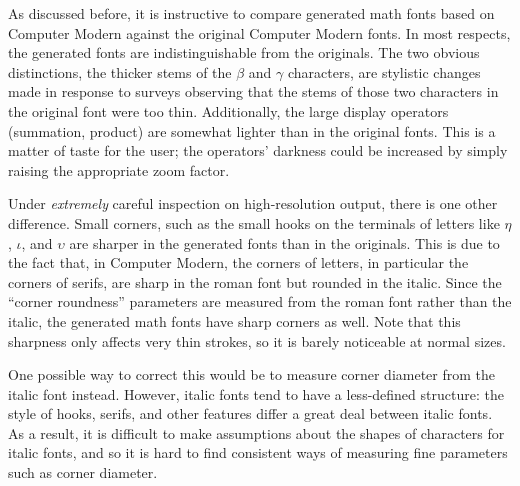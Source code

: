 
As discussed before, it is instructive to compare generated math fonts based on
Computer Modern against the original Computer Modern fonts. In most respects,
the generated fonts are indistinguishable from the originals. The two obvious
distinctions, the thicker stems of the $\beta$ and $\gamma$ characters, are
stylistic changes made in response to surveys observing that the stems of those
two characters in the original font were too thin. Additionally, the large
display operators (summation, product) are somewhat lighter than in the original
fonts. This is a matter of taste for the user; the operators' darkness could be
increased by simply raising the appropriate zoom factor.

Under \emph{extremely} careful inspection on high-resolution output, there is
one other difference. Small corners, such as the small hooks on the terminals of
letters like $\eta$, $\iota$, and $\upsilon$ are sharper in the generated fonts
than in the originals. This is due to the fact that, in Computer Modern, the
corners of letters, in particular the corners of serifs, are sharp in the roman
font but rounded in the italic. Since the ``corner roundness'' parameters are
measured from the roman font rather than the italic, the generated math fonts
have sharp corners as well. Note that this sharpness only affects very thin
strokes, so it is barely noticeable at normal sizes.

One possible way to correct this would be to measure corner diameter from the
italic font instead. However, italic fonts tend to have a less-defined
structure: the style of hooks, serifs, and other features differ a great deal
between italic fonts. As a result, it is difficult to make assumptions about the
shapes of characters for italic fonts, and so it is hard to find consistent ways
of measuring fine parameters such as corner diameter.
